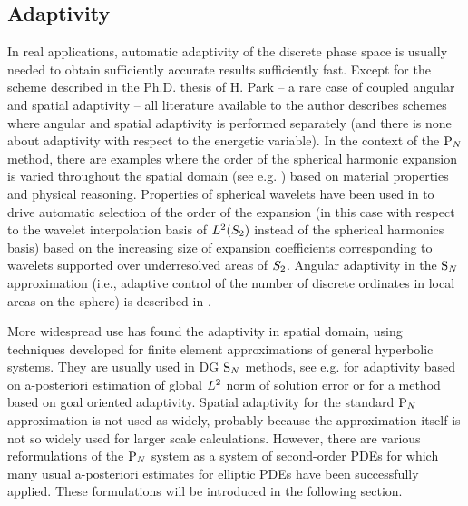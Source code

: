\subsection{Adaptivity}
In real applications, automatic adaptivity of the discrete phase space is usually needed to obtain sufficiently accurate
results sufficiently fast. Except for the scheme described in the Ph.D. thesis of H. Park \cite{Park} -- a rare case of coupled angular and spatial adaptivity -- all literature
available to the author describes schemes where angular and spatial adaptivity is performed separately (and there is
none about adaptivity with respect to the energetic variable). In the context of the $\PN$ method, there are examples
where the order of the spherical harmonic expansion is varied throughout the spatial domain (see e.g. \cite{Ackroyd2})
based on material properties and physical reasoning. Properties of spherical wavelets have been used in \cite{Buchan} to
drive automatic selection of the order of the expansion (in this case with respect to the wavelet interpolation basis of
$\Lp[2](\Sphere)$ instead of the spherical harmonics basis) based on the increasing size of expansion coefficients
corresponding to wavelets supported over underresolved areas of $\Sphere$. Angular adaptivity in the $\SN$ approximation
(i.e., adaptive control of the number of discrete ordinates in local areas on the sphere) is described in
\cite{Jarrell}.

More widespread use has found the adaptivity in spatial domain, using techniques developed for finite element
approximations of general hyperbolic systems. They are usually used in DG $\SN$ methods, see e.g.
\cite{Fournier,Duo,ragusa2010two} for adaptivity based on a-posteriori estimation of global $\Lp[2]$ norm of solution
error or \cite{LathouwersGoal, Wang2} for a method based on goal oriented adaptivity. Spatial adaptivity for the
standard $\PN$ approximation is not used as widely, probably because the approximation itself is not so widely used for
larger scale calculations. However, there are various reformulations of the $\PN$ system as a system of second-order
PDEs for which many usual a-posteriori estimates for
elliptic PDEs have been successfully applied. These formulations will be introduced in the
following section.

